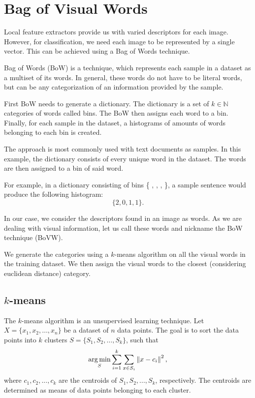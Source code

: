 \section{Bag of Visual Words}
Local feature extractors provide us with varied descriptors for each image. However, for classification, we need each image to be represented by a single vector. This can be achieved using a Bag of Words technique.

Bag of Words (BoW) is a technique, which represents each sample in a dataset as a multiset of its words. In general, these words do not have to be literal words, but can be any categorization of an information provided by the sample.

First BoW needs to generate a dictionary. The dictionary is a set of $k \in \mathbb{N}$ categories of words called bins. The BoW then assigns each word to a bin. Finally, for each sample in the dataset, a histograms of amounts of words belonging to each bin is created.

The approach is most commonly used with text documents as samples. In this example, the dictionary consists of every unique word in the dataset. The words are then assigned to a bin of said word.

For example, in a dictionary consisting of bins \{ , , ,  \}, a sample sentence  would produce the following histogram:
\begin{equation}
    \{2, 0, 1, 1\}.
\end{equation}

In our case, we consider the descriptors found in an image as words. As we are dealing with visual information, let us call these words  and nickname the BoW technique  (BoVW).

We generate the categories using a $k$-means algorithm on all the visual words in the training dataset. We then assign the visual words to the closest (considering euclidean distance) category.

\subsection{$k$-means}
The $k$-means algorithm is an unsupervised learning technique. Let $X=\{ x_1, x_2, \dots, x_n \}$ be a dataset of $n$ data points. The goal is to sort the data points into $k$ clusters $S = \{ S_1, S_2, \dots, S_k \}$, such that
\begin{equation}
    \operatorname*{arg\,min}_S \sum_{i=1}^k \sum_{x\in S_i} \left\lVert x-c_i\right\rVert^2,
\end{equation}
where \(c_1, c_2, ..., c_k \) are the centroids of \(S_1, S_2, ..., S_k \), respectively. The centroids are determined as means of data points belonging to each cluster.

